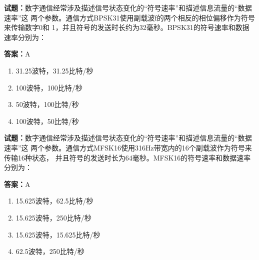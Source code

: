 \documentclass{ctexbook}
\begin{document}




\vspace{1em}

\textbf{试题：}数字通信经常涉及描述信号状态变化的“符号速率”和描述信息流量的“数据速率”这
两个参数。通信方式BPSK31使用副载波f的两个相反的相位偏移作为符号来传输数字0和
1，并且符号的发送时长约为32毫秒。BPSK31的符号速率和数据速率分别为： 

\textbf{答案：}A 

\begin{enumerate}[leftmargin=3em]
  \item 31.25波特，31.25比特/秒 

  \item 100波特，100比特/秒 

  \item 50波特，100比特/秒 

  \item 100波特，50比特/秒 

\end{enumerate}





\vspace{1em}

\textbf{试题：}数字通信经常涉及描述信号状态变化的“符号速率”和描述信息流量的“数据速率”这
两个参数。通信方式MFSK16使用316Hz带宽内的16个副载波作为符号来传输16种状态，
并且符号的发送时长为64毫秒。MFSK16的符号速率和数据速率分别为： 

\textbf{答案：}A 

\begin{enumerate}[leftmargin=3em]
  \item 15.625波特，62.5比特/秒 

  \item 15.625波特，250比特/秒 


  \item 15.625波特，15.625比特/秒 

  \item 62.5波特，250比特/秒 

\end{enumerate}





\vspace{1em}
\end{document}
